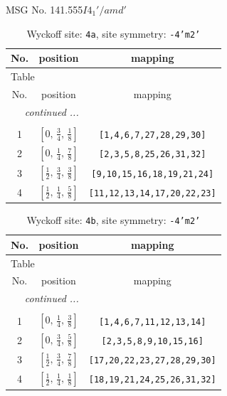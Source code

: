 \documentclass[fleqn,8pt]{jsarticle}
\begin{document}
\setcounter{MaxMatrixCols}{32}

\renewcommand{\tablename}{Table~}
\renewcommand{\figurename}{Figure~}
\begin{center}
\LARGE
MSG No. 141.555\quad$I4_{1}'/amd'$
\end{center}
\renewcommand{\arraystretch}{1.2}
\begin{longtable}{ccc}
\caption{Wyckoff site: {\tt 4a}, site symmetry: {\tt -4'm2'}}
 \\
 \hline \hline
No. & position & mapping \\ \hline \endfirsthead

\multicolumn{2}{l}{\tablename\ \thetable{}} \\
 \hline \hline
No. & position & mapping \\ \hline \endhead

 \hline \hline
\multicolumn{2}{r}{\footnotesize\it continued ...} \\ \endfoot

 \hline \hline
\multicolumn{2}{r}{} \\ \endlastfoot

1 & $\left[ 0,\, \frac{3}{4},\, \frac{1}{8} \right]$ & {\tt [1,4,6,7,27,28,29,30]} \\ \hline
2 & $\left[ 0,\, \frac{1}{4},\, \frac{7}{8} \right]$ & {\tt [2,3,5,8,25,26,31,32]} \\ \hline
3 & $\left[ \frac{1}{2},\, \frac{3}{4},\, \frac{3}{8} \right]$ & {\tt [9,10,15,16,18,19,21,24]} \\ \hline
4 & $\left[ \frac{1}{2},\, \frac{1}{4},\, \frac{5}{8} \right]$ & {\tt [11,12,13,14,17,20,22,23]} \\
\end{longtable}
\renewcommand{\arraystretch}{1.2}
\begin{longtable}{ccc}
\caption{Wyckoff site: {\tt 4b}, site symmetry: {\tt -4'm2'}}
 \\
 \hline \hline
No. & position & mapping \\ \hline \endfirsthead

\multicolumn{2}{l}{\tablename\ \thetable{}} \\
 \hline \hline
No. & position & mapping \\ \hline \endhead

 \hline \hline
\multicolumn{2}{r}{\footnotesize\it continued ...} \\ \endfoot

 \hline \hline
\multicolumn{2}{r}{} \\ \endlastfoot

1 & $\left[ 0,\, \frac{1}{4},\, \frac{3}{8} \right]$ & {\tt [1,4,6,7,11,12,13,14]} \\ \hline
2 & $\left[ 0,\, \frac{3}{4},\, \frac{5}{8} \right]$ & {\tt [2,3,5,8,9,10,15,16]} \\ \hline
3 & $\left[ \frac{1}{2},\, \frac{3}{4},\, \frac{7}{8} \right]$ & {\tt [17,20,22,23,27,28,29,30]} \\ \hline
4 & $\left[ \frac{1}{2},\, \frac{1}{4},\, \frac{1}{8} \right]$ & {\tt [18,19,21,24,25,26,31,32]} \\
\end{longtable}
\end{document}
